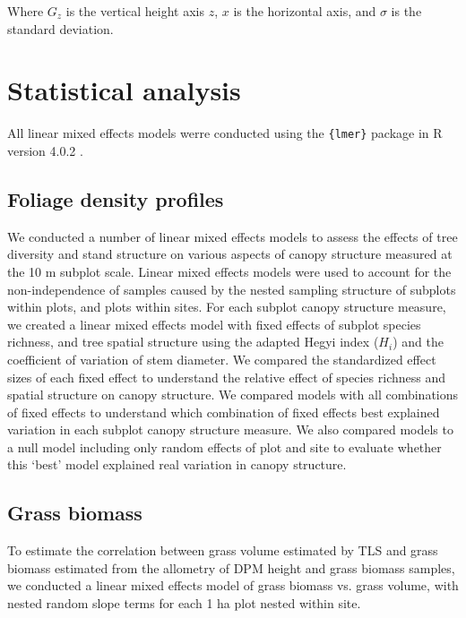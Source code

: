 \documentclass[11pt,a4paper]{article}
\begin{document}
Where $G_{z}$ is the vertical height axis $z$, $x$ is the horizontal axis, and $\sigma{}$ is the standard deviation.

\section{Statistical analysis}

All linear mixed effects models werre conducted using the \texttt{\{lmer\}} package in R version 4.0.2 \citep{R2021}.

\subsection{Foliage density profiles}

We conducted a number of linear mixed effects models to assess the effects of tree diversity and stand structure on various aspects of canopy structure measured at the 10 m subplot scale. Linear mixed effects models were used to account for the non-independence of samples caused by the nested sampling structure of subplots within plots, and plots within sites. For each subplot canopy structure measure, we created a linear mixed effects model with fixed effects of subplot species richness, and tree spatial structure using the adapted Hegyi index ($H_{i}$) and the coefficient of variation of stem diameter. We compared the standardized effect sizes of each fixed effect to understand the relative effect of species richness and spatial structure on canopy structure. We compared models with all combinations of fixed effects to understand which combination of fixed effects best explained variation in each subplot canopy structure measure. We also compared models to a null model including only random effects of plot and site to evaluate whether this `best' model explained real variation in canopy structure.

\subsection{Grass biomass}

To estimate the correlation between grass volume estimated by TLS and grass biomass estimated from the allometry of DPM height and grass biomass samples, we conducted a linear mixed effects model of grass biomass vs. grass volume, with nested random slope terms for each 1 ha plot nested within site. 
\end{document}
